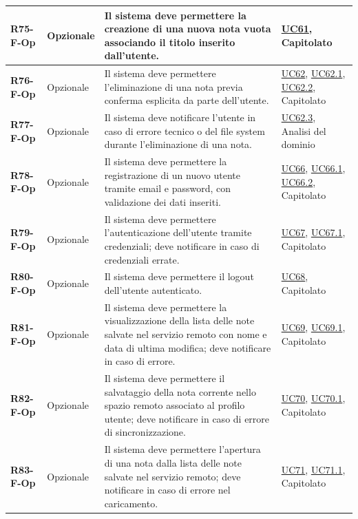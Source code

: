\begin{longtable}{|p{2.5cm}|p{2.2cm}|p{6.8cm}|p{2.7cm}|}
	\textbf{R75-F-Op} & Opzionale & Il sistema deve permettere la creazione di una nuova nota vuota associando il titolo inserito dall'utente. & \hyperlink{uc61}{UC61}, Capitolato \\ \hline
	\textbf{R76-F-Op} & Opzionale & Il sistema deve permettere l'eliminazione di una nota previa conferma esplicita da parte dell'utente. & \hyperlink{uc62}{UC62}, \hyperlink{uc62.1}{UC62.1}, \hyperlink{uc62.2}{UC62.2}, Capitolato \\ \hline
	\textbf{R77-F-Op} & Opzionale & Il sistema deve notificare l'utente in caso di errore tecnico o del file system durante l'eliminazione di una nota. & \hyperlink{uc62.3}{UC62.3}, Analisi del dominio \\ \hline
	\textbf{R78-F-Op} & Opzionale & Il sistema deve permettere la registrazione di un nuovo utente tramite email e password, con validazione dei dati inseriti. & \hyperlink{uc66}{UC66}, \hyperlink{uc66.1}{UC66.1}, \hyperlink{uc66.2}{UC66.2}, Capitolato \\ \hline
	\textbf{R79-F-Op} & Opzionale & Il sistema deve permettere l'autenticazione dell'utente tramite credenziali; deve notificare in caso di credenziali errate. & \hyperlink{uc67}{UC67}, \hyperlink{uc67.1}{UC67.1}, Capitolato \\ \hline
	\textbf{R80-F-Op} & Opzionale & Il sistema deve permettere il logout dell'utente autenticato. & \hyperlink{uc68}{UC68}, Capitolato \\ \hline
	\textbf{R81-F-Op} & Opzionale & Il sistema deve permettere la visualizzazione della lista delle note salvate nel servizio remoto con nome e data di ultima modifica; deve notificare in caso di errore. & \hyperlink{uc69}{UC69}, \hyperlink{uc69.1}{UC69.1}, Capitolato \\ \hline
	\textbf{R82-F-Op} & Opzionale & Il sistema deve permettere il salvataggio della nota corrente nello spazio remoto associato al profilo utente; deve notificare in caso di errore di sincronizzazione. & \hyperlink{uc70}{UC70}, \hyperlink{uc70.1}{UC70.1}, Capitolato \\ \hline
	\textbf{R83-F-Op} & Opzionale & Il sistema deve permettere l'apertura di una nota dalla lista delle note salvate nel servizio remoto; deve notificare in caso di errore nel caricamento. & \hyperlink{uc71}{UC71}, \hyperlink{uc71.1}{UC71.1}, Capitolato \\ \hline

\end{longtable}

